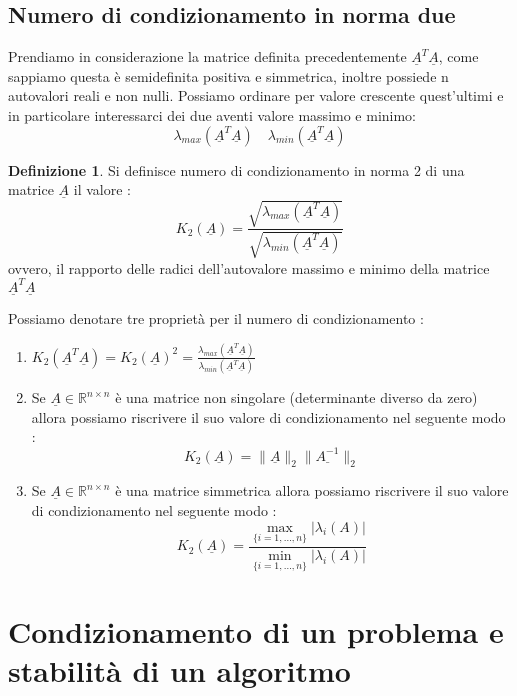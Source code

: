 \documentclass[12pt, a4paper]{book}
\theoremstyle{definition}
\newtheorem{defn}{Definizione}[section]
\newcommand{\VarMtrx}[1]{\ensuremath{\underline{#1}}}
\begin{document}
\section{Numero di condizionamento in norma due}
\begin{flushleft}


Prendiamo in considerazione la matrice definita precedentemente $\VarMtrx{A}^{T}\VarMtrx{A}$, come sappiamo questa è semidefinita positiva e simmetrica, inoltre possiede n autovalori reali e non nulli.
Possiamo ordinare per valore crescente quest'ultimi e in particolare interessarci dei due aventi valore massimo e minimo: 
\[ \lambda_{max}(\VarMtrx{A}^{T}\VarMtrx{A}) \quad \lambda_{min}(\VarMtrx{A}^{T}\VarMtrx{A}) \]

\begin{defn}
Si definisce numero di condizionamento in norma 2 di una matrice $\VarMtrx{A}$ il valore : 
\[ K_{2}(\VarMtrx{A})= \frac{\sqrt{ \lambda_{max}(\VarMtrx{A}^{T}\VarMtrx{A})}}{\sqrt{ \lambda_{min}(\VarMtrx{A}^{T}\VarMtrx{A})}}\]
ovvero, il rapporto delle radici dell'autovalore massimo e minimo della matrice  $\VarMtrx{A}^{T}\VarMtrx{A}$
\end{defn}

Possiamo denotare tre proprietà per il numero di condizionamento :

\begin{enumerate}
	\item $K_{2}(\VarMtrx{A}^{T}\VarMtrx{A}) = K_{2}(\VarMtrx{A})^{2} = \frac{\lambda_{max}(\VarMtrx{A}^{T}\VarMtrx{A})}{\lambda_{min}(\VarMtrx{A}^{T}\VarMtrx{A})}$
	\item Se $\VarMtrx{A} \in \mathbb{R}^{n \times n}$ è una matrice non singolare (determinante diverso da zero) allora possiamo riscrivere il suo valore di condizionamento nel seguente modo : 
	\[K_{2}(\VarMtrx{A}) = \lVert\VarMtrx{A}\rVert_{2}\lVert\VarMtrx{A^{-1}}\rVert_{2} \]
	\item Se $\VarMtrx{A} \in \mathbb{R}^{n \times n}$ è una matrice simmetrica allora possiamo riscrivere il suo valore di condizionamento nel seguente modo : 
	\[K_{2}(\VarMtrx{A}) = \frac{\max_{\{i=1,\dots, n\}}|\lambda_{i}(A)|}{\min_{\{i=1,\dots, n\}}|\lambda_{i}(A)|} \]
\end{enumerate}

\end{flushleft}

\chapter{Condizionamento di un problema e stabilità di un algoritmo}
\end{document}
